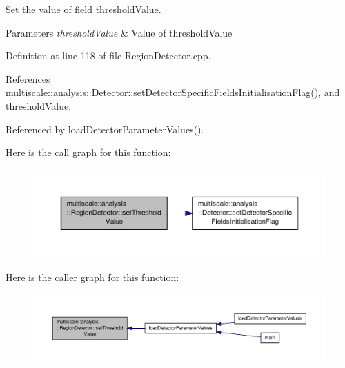 Set the value of field threshold\-Value. 


\begin{DoxyParams}{Parameters}
{\em threshold\-Value} & Value of threshold\-Value \\
\hline
\end{DoxyParams}


Definition at line 118 of file Region\-Detector.\-cpp.



References multiscale\-::analysis\-::\-Detector\-::set\-Detector\-Specific\-Fields\-Initialisation\-Flag(), and threshold\-Value.



Referenced by load\-Detector\-Parameter\-Values().



Here is the call graph for this function\-:
\nopagebreak
\begin{figure}[H]
\begin{center}
\leavevmode
\includegraphics[width=350pt]{classmultiscale_1_1analysis_1_1RegionDetector_a066e87a1f134194dabfc760d241b8ab2_cgraph}
\end{center}
\end{figure}




Here is the caller graph for this function\-:\nopagebreak
\begin{figure}[H]
\begin{center}
\leavevmode
\includegraphics[width=350pt]{classmultiscale_1_1analysis_1_1RegionDetector_a066e87a1f134194dabfc760d241b8ab2_icgraph}
\end{center}
\end{figure}


